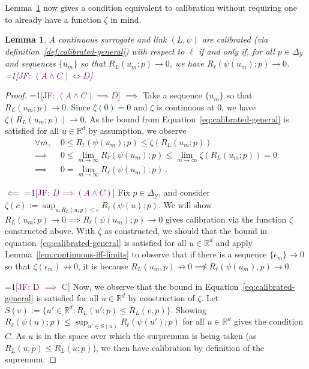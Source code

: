 \documentclass{article}
\newcommand{\Comments}{1}
\newcommand{\mynote}[2]{\ifnum\Comments=1\textcolor{#1}{#2}\fi}
\newcommand{\jessie}[1]{\mynote{purple}{[JF: #1]}}
\newcommand{\reals}{\mathbb{R}}
\newcommand{\simplex}{\Delta_\Y}
\newcommand{\Y}{\mathcal{Y}}
\newtheorem{lemma}{Lemma}
\begin{document}
Lemma~\ref{lem:calib-converging-regrets} now gives a condition equivalent to calibration without requiring one to already have a function $\zeta$ in mind.
\begin{lemma}\label{lem:calib-converging-regrets}
	A continuous surrogate and link $(L,\psi)$ are calibrated (via definition~\ref{def:calibrated-general}) with respect to $\ell$ if and only if, for all $p \in \simplex$ and sequences $\{u_m\}$ so that $R_L(u_m; p) \to 0$, we have $R_\ell(\psi(u_m); p) \to 0$.
	\jessie{$(A \wedge C) \iff D$}
\end{lemma}
\begin{proof}
\jessie{$(A \wedge C) \implies D$}
	$\implies$ Take a sequence $\{u_m\}$ so that $R_L(u_m;p) \to 0$.
	Since $\zeta(0) = 0$ and $\zeta$ is continuous at $0$, we have $\zeta(R_L(u_m;p)) \to 0$.
	As the bound from Equation~\eqref{eq:calibrated-general} is satisfied for all $u \in \reals^d$ by assumption, we observe
	\begin{align*}
	\forall m, \; &0 \leq R_\ell(\psi(u_m); p) \leq \zeta(R_L(u_m;p))\\
	\implies &0 \leq \lim_{m \to \infty} R_\ell(\psi(u_m); p) \leq \lim_{m \to \infty} \zeta(R_L(u_m;p)) = 0\\
	\implies &0 = \lim_{m\to\infty} R_\ell(\psi(u_m); p) ~.~
	\end{align*}
	
	
	$\impliedby$ 
\jessie{$D \implies (A \wedge C)$}
	Fix $p \in \simplex$, and consider $\zeta(c) := \sup_{u: R_L(u;p) \leq c} R_\ell(\psi(u); p)$.  
	We will show $R_L(u_m; p) \to 0 \implies R_\ell(\psi(u_m); p) \to 0$ gives calibration via the function $\zeta$ constructed above. 
	With $\zeta$ as constructed, we should that the bound in equation~\eqref{eq:calibrated-general} is satisfied for all $u \in \reals^d$ and apply Lemma~\ref{lem:continuous-iff-limits} to observe that if there is a sequence $\{\epsilon_m\} \to 0$ so that $\zeta(\epsilon_m) \not \to 0$, it is because $R_L(u_m, p) \not \to 0 \not \implies R_\ell(\psi(u_m), p) \to 0$.
	

\jessie{D $\implies$ C}
Now, we observe that the bound in Equation~\eqref{eq:calibrated-general} is satisfied for all $u \in \reals^d$ by construction of $\zeta$.
Let $S(v) := \{u' \in \reals^d : R_L(u';p) \leq R_L(v,p) \}$.
Showing $R_\ell(\psi(u);p) \leq \sup_{u' \in S(u)} R_\ell(\psi(u') ; p)$ for all $u \in \reals^d$ gives the condition $C$.
As $u$ is in the space over which the surpremum is being taken (as $R_L(u;p) \leq R_L(u;p)$), we then have calibration by definition of the supremum.


\end{proof}
\end{document}
